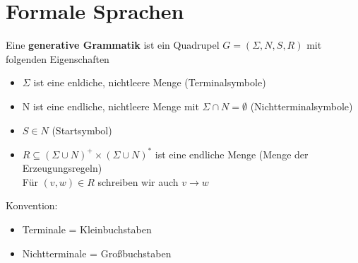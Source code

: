 \documentclass[14pt]{article}
\begin{document}
\section{Formale Sprachen}
\begin{definition}
    Eine \textbf{generative Grammatik} ist ein Quadrupel $G = (\varSigma, N, S, R)$
    mit folgenden Eigenschaften
    \begin{itemize}
        \item $\varSigma$ ist eine enldiche, nichtleere Menge (Terminalsymbole)
        \item N ist eine endliche, nichtleere Menge mit $\varSigma \cap N = \emptyset$
        (Nichtterminalsymbole)
        \item $S \in N$ (Startsymbol)
        \item $R \subseteq (\varSigma \cup N)^+ \times (\varSigma \cup N)^*$ ist 
        eine endliche Menge (Menge der Erzeugungsregeln) \\
        Für $(v, w) \in R$ schreiben wir auch $v \rightarrow w$
    \end{itemize}
    Konvention: 
    \begin{itemize}
        \item Terminale = Kleinbuchstaben
        \item Nichtterminale = Großbuchstaben
    \end{itemize}
\end{definition}
\end{document}
